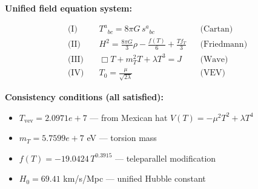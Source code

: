 
\textbf{Unified field equation system:}

\begin{align}
  \text{(I)} \quad & T^a{}_{bc} = 8\pi G \, s^a{}_{bc} && \text{(Cartan)} \\
  \text{(II)} \quad & H^2 = \frac{8\pi G}{3}\rho - \frac{f(T)}{6} + \frac{Tf_T}{3} && \text{(Friedmann)} \\
  \text{(III)} \quad & \Box T + m_T^2 T + \lambda T^3 = J && \text{(Wave)} \\
  \text{(IV)} \quad & T_0 = \frac{\mu}{\sqrt{2\lambda}} && \text{(VEV)}
\end{align}

\textbf{Consistency conditions (all satisfied):}
\begin{itemize}
  \item $T_{\text{vev}} = 2.0971e+7$ — from Mexican hat $V(T) = -\mu^2 T^2 + \lambda T^4$
  \item $m_T = 5.7599e+7$ eV — torsion mass
  \item $f(T) = -19.0424 \, T^{0.3915}$ — teleparallel modification
  \item $H_0 = 69.41$ km/s/Mpc — unified Hubble constant
\end{itemize}